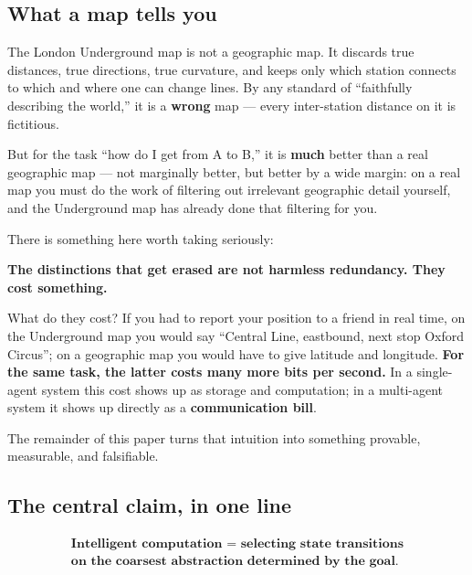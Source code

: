 \documentclass[11pt]{article}
\renewenvironment{quote}
  {\def\FrameCommand{{\color{gray!60}\vrule width 2pt}\hspace{8pt}}%
   \MakeFramed{\advance\hsize-\width \FrameRestore}\begin{itshape}}
  {\end{itshape}\endMakeFramed}
\begin{document}
\hypertarget{what-a-map-tells-you}{%
\subsection{What a map tells you}\label{what-a-map-tells-you}}

The London Underground map is not a geographic map. It discards true distances, true directions, true curvature, and keeps only which station connects to which and where one can change lines. By any standard of ``faithfully describing the world,'' it is a \textbf{wrong} map --- every inter-station distance on it is fictitious.

But for the task ``how do I get from A to B,'' it is \textbf{much} better than a real geographic map --- not marginally better, but better by a wide margin: on a real map you must do the work of filtering out irrelevant geographic detail yourself, and the Underground map has already done that filtering for you.

There is something here worth taking seriously:

\begin{quote}
\textbf{The distinctions that get erased are not harmless redundancy. They cost something.}
\end{quote}

What do they cost? If you had to report your position to a friend in real time, on the Underground map you would say ``Central Line, eastbound, next stop Oxford Circus''; on a geographic map you would have to give latitude and longitude. \textbf{For the same task, the latter costs many more bits per second.} In a single-agent system this cost shows up as storage and computation; in a multi-agent system it shows up directly as a \textbf{communication bill}.

The remainder of this paper turns that intuition into something provable, measurable, and falsifiable.

\hypertarget{the-central-claim-in-one-line}{%
\subsection{The central claim, in one line}\label{the-central-claim-in-one-line}}

\[\boxed{\begin{array}{c}\textbf{Intelligent computation = selecting state transitions}\\\textbf{on the coarsest abstraction determined by the goal.}\end{array}}\]
\end{document}
